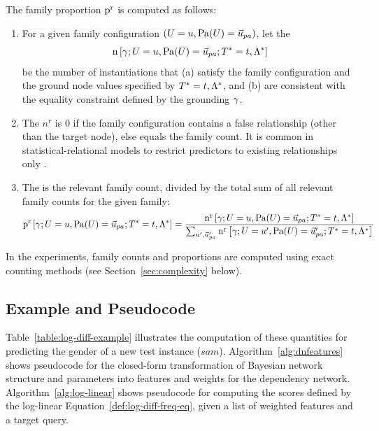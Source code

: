 \documentclass{sfuthesis}
\renewcommand{\Qconj}{\Appendterm{\FG{\TT} = \TV} {\QC}} %
\begin{document}
The family proportion $\mathrm{p}^{\mathrm{r}}$ is computed as follows:
\begin{enumerate}
\item For a given family configuration $(\Appendterm{\UT  = \UV} {\Pa{\UT} = \Prange{\UT}})$, let the  $$\Count{\Appendterm{\grounding;\UT  = \UV} {\Pa{\UT} = \Prange{\UT}}} {\Qconj}$$ be the number of instantiations that (a) satisfy the family configuration and the ground node values specified by $\Qconj$, and (b) are consistent with the equality constraint defined by the grounding $\gamma$.
\item The  $n^{r}$ is 0 if the family configuration contains a false relationship (other than the target node), else equals the family count. It is common in statistical-relational models to restrict predictors to existing relationships only \cite{Getoor2007c,Russell2010}.
\item The  is the relevant family count, divided by the total sum of all relevant family counts for the given family:
{\scriptsize
\begin{equation} \notag
 \Relfreq{\Appendterm{\grounding;\UT  = \UV} {\Pa{\UT} = \Prange{\UT}}} {\Qconj} = \frac{\Relcount{\Appendterm{\grounding;\UT  = \UV} {\Pa{\UT} = \Prange{\UT}}} {\Qconj}}{\sum_{\UV',\Prange{\UT}'}\Relcount{\Appendterm{\grounding;\UT  = \UV'} {\Pa{\UT} = \Prange{\UT}'}} {\Qconj}}
\end{equation}
}
\end{enumerate}

In the experiments, family counts and proportions are computed using exact counting methods (see Section~\ref{sec:complexity} below).


\subsection{Example and Pseudocode}
Table~\ref{table:log-diff-example} illustrates the computation of these quantities for predicting the gender of a new test instance ($sam$). Algorithm~\ref{alg:dnfeatures} shows pseudocode for the closed-form transformation of Bayesian network structure and parameters into features and weights for the dependency network. Algorithm~\ref{alg:log-linear} shows pseudocode for computing the scores defined by the log-linear Equation~\eqref{def:log-diff-freq-eq}, given a list of weighted features and a target query. 
\end{document}

